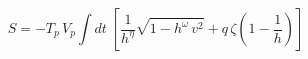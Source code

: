 \begin{equation} \label{FullAction}
    S = - T_p \, V_p \int dt \; \left[ \frac{1}{h^{\eta}} \sqrt{1 - h^\omega \, v^2}
    +  q \, \zeta \left( 1 - \frac{1}{h} \right) \right]
\end{equation}

